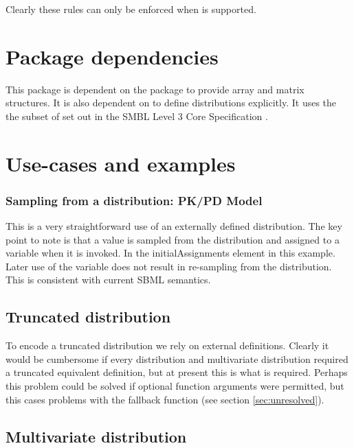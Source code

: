 \documentclass[draftspec]{sbmlpkgspec}
\begin{document}
Clearly these rules can only be enforced when \distrib is supported.

\section{Package dependencies}

This package is dependent on the \arrays package to provide array and
matrix structures. It is also dependent on \mathml \cite{mathml2} to
define distributions explicitly. It uses the the subset of \mathml set
out in the SMBL Level 3 Core Specification
\cite{l3v1c}.

\section{Use-cases and examples}

\subsubsection{Sampling from a distribution: PK/PD Model}

This is a very straightforward use of an externally defined
distribution. The key point to note is that a value is sampled from
the distribution and assigned to a variable when it is invoked. In the
initialAssignments element in this example. Later use of the variable
does not result in re-sampling from the distribution. This is
consistent with current SBML semantics.


\subsection{Truncated distribution}
\label{sec: truncated-eg}

To encode a truncated distribution we rely on external
definitions. Clearly it would be cumbersome if every distribution and
multivariate distribution required a truncated equivalent definition,
but at present this is what is required\contraversial. Perhaps this
problem could be solved if optional function arguments were permitted,
but this cases problems with the fallback function (see section \ref{sec:unresolved}).


\subsection{Multivariate distribution}
\end{document}
